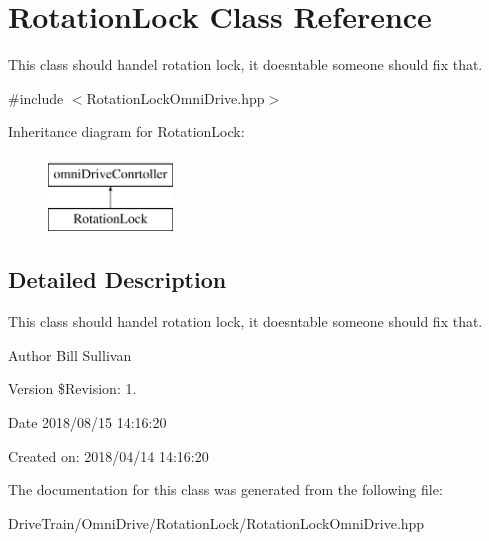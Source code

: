\hypertarget{class_rotation_lock}{}\section{Rotation\+Lock Class Reference}
\label{class_rotation_lock}


This class should handel rotation lock, it doesn\textquotesingle{}table someone should fix that.  




{\ttfamily \#include $<$Rotation\+Lock\+Omni\+Drive.\+hpp$>$}

Inheritance diagram for Rotation\+Lock\+:\begin{figure}[H]
\begin{center}
\leavevmode
\includegraphics[height=2.000000cm]{class_rotation_lock}
\end{center}
\end{figure}


\subsection{Detailed Description}
This class should handel rotation lock, it doesn\textquotesingle{}table someone should fix that. 

\begin{DoxyAuthor}{Author}
Bill Sullivan
\end{DoxyAuthor}
\begin{DoxyVersion}{Version}
\$\+Revision\+: 1.
\end{DoxyVersion}
\begin{DoxyDate}{Date}
2018/08/15 14\+:16\+:20
\end{DoxyDate}
Created on\+: 2018/04/14 14\+:16\+:20 

The documentation for this class was generated from the following file\+:\begin{DoxyCompactItemize}
\item 
Drive\+Train/\+Omni\+Drive/\+Rotation\+Lock/Rotation\+Lock\+Omni\+Drive.\+hpp\end{DoxyCompactItemize}
